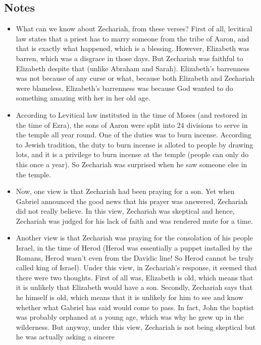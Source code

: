 \subsection*{Notes}
\begin{itemize}
  \item{What can we know about Zechariah, from these verses?  First of all,
  levitical law states that a priest has to marry someone from the tribe of
  Aaron, and that is exactly what happened, which is a blessing.  However,
  Elizabeth was barren, which was a disgrace in those days.  But Zechariah
  was faithful to Elizabeth despite that (unlike Abraham and Sarah).
  Elizabeth's barrenness was not because of any curse or what, because both
  Elizabeth and Zechariah were blameless. Elizabeth's barrenness was because God wanted to do something amazing with her in her old age. }
  \item{According to Levitical law instituted in the time of Moses (and
  restored in the time of Ezra), the sons of Aaron were split into $24$
  divisions to serve in the temple all year round.  One of the duties was to
  burn incense.  According to Jewish tradition, the duty to burn incense is
  alloted to people by drawing lots, and it is a privilege to burn incense at
  the temple (people can only do this once a year).  So Zechariah was
  surprised when he saw someone else in the temple.}
  \item{Now, one view is that Zechariah had been praying for a son.  Yet when
  Gabriel announced the good news that his prayer was answered, Zechariah did
  not really believe.  In this view, Zechariah was skeptical and hence,
  Zechariah was judged for his lack of faith and was rendered mute for a
  time.}
  \item{Another view is that Zechariah was praying for the consolation of his
  people Israel, in the time of Herod (Herod was essentially a puppet
  installed by the Romans, Herod wasn't even from the Davidic line!  So Herod
  cannot be truly called king of Israel).  Under this view, in Zechariah's
  response, it seemed that there were two thoughts.  First of all was,
  Elizabeth is old, which means that it is unlikely that Elizabeth would have
  a son.  Secondly, Zechariah says that he himself is old, which means that
  it is unlikely for him to see and know whether what Gabriel has said would
  come to pass.  In fact, John the baptist was probably orphaned at a young
  age, which was why he grew up in the wilderness.  But anyway, under this
  view, Zechariah is not being skeptical but he was actually asking a sincere
}
\end{itemize}
